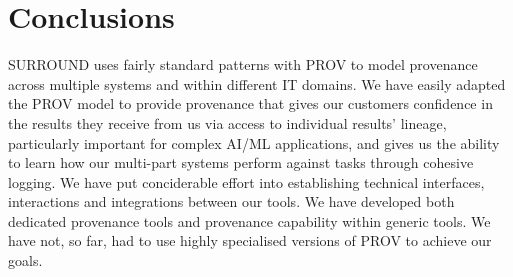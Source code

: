 \documentclass[letterpaper,twocolumn,10pt]{article}
\begin{document}
\section{Conclusions}
SURROUND uses fairly standard patterns with PROV to model provenance across multiple systems and within different IT domains.
We have easily adapted the PROV model to provide provenance that gives our customers confidence in the results
they receive from us via access to individual results' lineage, particularly important for complex AI/ML applications, and gives us the 
ability to learn how our multi-part systems perform against tasks through cohesive logging. We have put conciderable effort into establishing
technical interfaces, interactions and integrations between our tools. We have developed both dedicated provenance tools and provenance
capability within generic tools. We have not, so far, had to use highly specialised versions of PROV to achieve our goals.


% 


\end{document}
